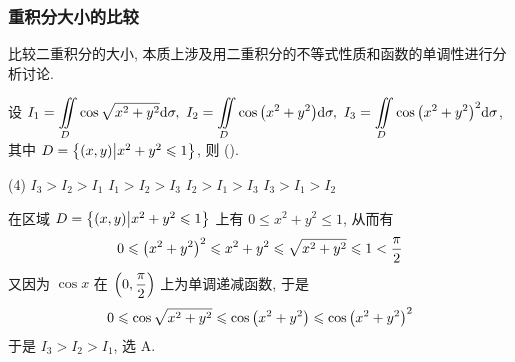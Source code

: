 \subsubsection{重积分大小的比较}

比较二重积分的大小, 本质上涉及用二重积分的不等式性质和函数的单调性进行分析讨论.

\begin{example}[2005 数一]
    设 $\displaystyle I_1=\iint\limits_D\cos\sqrt{x^2+y^2}\dd \sigma,~I_2=\iint\limits_D\cos\qty(x^2+y^2)\dd \sigma,~I_3=\iint\limits_D \cos\qty(x^2+y^2)^2\dd \sigma$, 其中 $D=\qty{(x,y)\big| x^2+y^2\leqslant 1}$, 则 (\quad).
    \begin{tasks}(4)
        \task $I_3>I_2>I_1$
        \task $I_1>I_2>I_3$
        \task $I_2>I_1>I_3$
        \task $I_3>I_1>I_2$
    \end{tasks}
\end{example}
\begin{solution}
    在区域 $D=\qty{(x,y)\big| x^2+y^2\leqslant 1}$ 上有 $0\leqslant x^2+y^2\leqslant 1$, 从而有
    $$0\leqslant \qty(x^2+y^2)^2\leqslant x^2+y^2\leqslant \sqrt{x^2+y^2}\leqslant 1<\dfrac{\pi}{2}$$
    又因为 $\cos x$ 在 $\qty(0,\dfrac{\pi}{2})$ 上为单调递减函数, 于是
    $$0\leqslant \cos\sqrt{x^2+y^2}\leqslant \cos\qty(x^2+y^2)\leqslant \cos\qty(x^2+y^2)^2$$
    于是 $I_3>I_2>I_1$, 选 A.
\end{solution}

